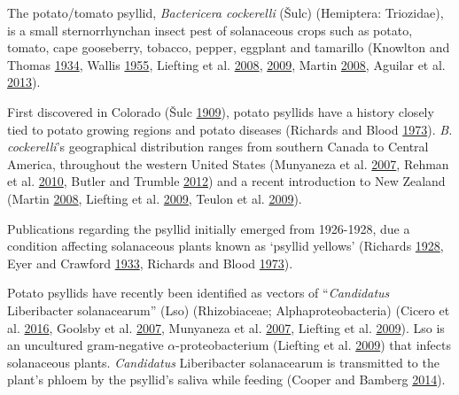\documentclass[]{article}
\begin{document}
The potato/tomato psyllid, \emph{Bactericera cockerelli} (Šulc)
(Hemiptera: Triozidae), is a small sternorrhynchan insect pest of
solanaceous crops such as potato, tomato, cape gooseberry, tobacco,
pepper, eggplant and tamarillo (Knowlton and Thomas
\protect\hyperlink{ref-Knowlton1934}{1934}, Wallis
\protect\hyperlink{ref-Wallis1955}{1955}, Liefting et al.
\protect\hyperlink{ref-Liefting2008}{2008},
\protect\hyperlink{ref-Liefting2009}{2009}, Martin
\protect\hyperlink{ref-Martin2008}{2008}, Aguilar et al.
\protect\hyperlink{ref-Aguilar2013}{2013}).

First discovered in Colorado (Šulc
\protect\hyperlink{ref-Sulc1909}{1909}), potato psyllids have a history
closely tied to potato growing regions and potato diseases (Richards and
Blood \protect\hyperlink{ref-Richards1973}{1973}). \emph{B.
cockerelli}'s geographical distribution ranges from southern Canada to
Central America, throughout the western United States (Munyaneza et al.
\protect\hyperlink{ref-Munyaneza2007a}{2007}, Rehman et al.
\protect\hyperlink{ref-Rehman2010}{2010}, Butler and Trumble
\protect\hyperlink{ref-Butler2012a}{2012}) and a recent introduction to
New Zealand (Martin \protect\hyperlink{ref-Martin2008}{2008}, Liefting
et al. \protect\hyperlink{ref-Liefting2009}{2009}, Teulon et al.
\protect\hyperlink{ref-Teulon2009}{2009}).

Publications regarding the psyllid initially emerged from 1926-1928, due
a condition affecting solanaceous plants known as `psyllid yellows'
(Richards \protect\hyperlink{ref-Richards1928}{1928}, Eyer and Crawford
\protect\hyperlink{ref-Eyer1933}{1933}, Richards and Blood
\protect\hyperlink{ref-Richards1973}{1973}).

Potato psyllids have recently been identified as vectors of
``\emph{Candidatus} Liberibacter solanacearum'' (Lso) (Rhizobiaceae;
Alphaproteobacteria) (Cicero et al.
\protect\hyperlink{ref-Cicero2016}{2016}, Goolsby et al.
\protect\hyperlink{ref-Goolsby2007a}{2007}, Munyaneza et al.
\protect\hyperlink{ref-Munyaneza2007a}{2007}, Liefting et al.
\protect\hyperlink{ref-Liefting2009}{2009}). Lso is an uncultured
gram-negative \(\alpha\)-proteobacterium (Liefting et al.
\protect\hyperlink{ref-Liefting2009}{2009}) that infects solanaceous
plants. \emph{Candidatus} Liberibacter solanacearum is transmitted to
the plant's phloem by the psyllid's saliva while feeding (Cooper and
Bamberg \protect\hyperlink{ref-Cooper2014}{2014}).
\end{document}
